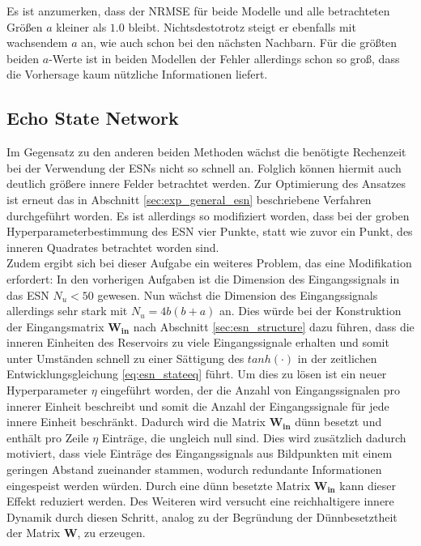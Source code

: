 Es ist anzumerken, dass der NRMSE für beide Modelle und alle betrachteten Größen $a$ kleiner als $1.0$ bleibt. Nichtsdestotrotz steigt er ebenfalls mit wachsendem $a$ an, wie auch schon bei den nächsten Nachbarn. Für die größten beiden $a$-Werte ist in beiden Modellen der Fehler allerdings schon so groß, dass die Vorhersage kaum nützliche Informationen liefert.

\subsection{Echo State Network}
Im Gegensatz zu den anderen beiden Methoden wächst die benötigte Rechenzeit bei der Verwendung der \textsc{ESN}s nicht so schnell an. Folglich können hiermit auch deutlich größere innere Felder betrachtet werden. Zur Optimierung des Ansatzes ist erneut das in Abschnitt \ref{sec:exp_general_esn} beschriebene Verfahren durchgeführt worden. Es ist allerdings so modifiziert worden, dass bei der groben Hyperparameterbestimmung des \textsc{ESN} vier Punkte, statt wie zuvor ein Punkt, des inneren Quadrates betrachtet worden sind.\\

Zudem ergibt sich bei dieser Aufgabe ein weiteres Problem, das eine Modifikation erfordert: In den vorherigen Aufgaben ist die Dimension des Eingangssignals in das \textsc{ESN} $N_u < 50$ gewesen. Nun wächst die Dimension des Eingangssignals allerdings sehr stark mit $N_u = 4b(b+a)$ an. Dies würde bei der Konstruktion der Eingangsmatrix $\mathbf{W_{in}}$ nach Abschnitt \ref{sec:esn_structure} dazu führen, dass die inneren Einheiten des Reservoirs zu viele Eingangssignale erhalten und somit unter Umständen schnell zu einer Sättigung des $tanh(\cdot)$ in der zeitlichen Entwicklungsgleichung \ref{eq:esn_stateeq} führt. Um dies zu lösen ist ein neuer Hyperparameter $\eta$ eingeführt worden, der die Anzahl von Eingangssignalen pro innerer Einheit beschreibt und somit die Anzahl der Eingangssignale für jede innere Einheit beschränkt. Dadurch wird die Matrix $\mathbf{W_{in}}$ dünn besetzt und enthält pro Zeile $\eta$ Einträge, die ungleich null sind. Dies wird zusätzlich dadurch motiviert, dass viele Einträge des Eingangssignals aus Bildpunkten mit einem geringen Abstand zueinander stammen, wodurch redundante Informationen eingespeist werden würden. Durch eine dünn besetzte Matrix $\mathbf{W_{in}}$ kann dieser Effekt reduziert werden. Des Weiteren wird versucht eine reichhaltigere innere Dynamik durch diesen Schritt, analog zu der Begründung der Dünnbesetztheit der Matrix $\mathbf{W}$, zu erzeugen.\\


